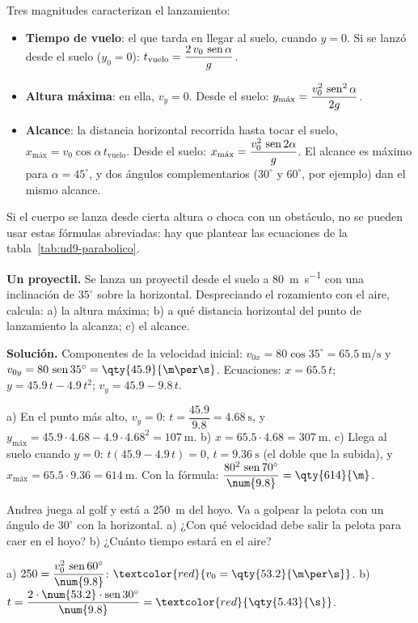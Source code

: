 Tres magnitudes caracterizan el lanzamiento:
\begin{itemize}
    \item \textbf{Tiempo de vuelo}: el que tarda en llegar al suelo, cuando \(y = 0\). Si se lanzó desde el suelo (\(y_0 = 0\)):
    \(t_{\text{vuelo}} = \dfrac{2\,v_0\,\operatorname{sen}\alpha}{g}\).
    \item \textbf{Altura máxima}: en ella, \(v_y = 0\). Desde el suelo: \(y_{\text{máx}} = \dfrac{v_0^2\,\operatorname{sen}^2\alpha}{2g}\).
    \item \textbf{Alcance}: la distancia horizontal recorrida hasta tocar el suelo, \(x_{\text{máx}} = v_0\cos\alpha\,t_{\text{vuelo}}\).
    Desde el suelo: \(x_{\text{máx}} = \dfrac{v_0^2\,\operatorname{sen} 2\alpha}{g}\). El alcance es máximo para \(\alpha = 45^\circ\), y dos
    ángulos complementarios (\(30^\circ\) y \(60^\circ\), por ejemplo) dan el mismo alcance.
\end{itemize}
Si el cuerpo se lanza desde cierta altura o choca con un obstáculo, no se pueden usar estas fórmulas abreviadas: hay que plantear las
ecuaciones de la tabla~\ref{tab:ud9-parabolico}.

\begin{example}
    \textbf{Un proyectil.} Se lanza un proyectil desde el suelo a \qty{80}{\m\per\s} con una inclinación de \(35^\circ\) sobre la
    horizontal. Despreciando el rozamiento con el aire, calcula: a) la altura máxima; b) a qué distancia horizontal del punto de
    lanzamiento la alcanza; c) el alcance.

    \textbf{Solución.} Componentes de la velocidad inicial: \(v_{0x} = 80\cos 35^\circ = \qty{65.5}{\m\per\s}\) y
    \(v_{0y} = 80\,\sen 35^\circ = \qty{45.9}{\m\per\s}\). Ecuaciones: \(x = \num{65.5}\,t\); \(y = \num{45.9}\,t - \num{4.9}\,t^2\);
    \(v_y = \num{45.9} - \num{9.8}\,t\).

    a) En el punto más alto, \(v_y = 0\): \(t = \dfrac{\num{45.9}}{\num{9.8}} = \qty{4.68}{\s}\), y
    \(y_{\text{máx}} = \num{45.9} \cdot \num{4.68} - \num{4.9} \cdot \num{4.68}^2 = \qty{107}{\m}\).
    b) \(x = \num{65.5} \cdot \num{4.68} = \qty{307}{\m}\).
    c) Llega al suelo cuando \(y = 0\): \(t(\num{45.9} - \num{4.9}\,t) = 0\), \(t = \qty{9.36}{\s}\) (el doble que la subida), y
    \(x_{\text{máx}} = \num{65.5} \cdot \num{9.36} = \qty{614}{\m}\). Con la fórmula: \(\dfrac{80^2\,\sen 70^\circ}{\num{9.8}} =
    \qty{614}{\m}\).
\end{example}

\begin{exercise}
    Andrea juega al golf y está a \qty{250}{\m} del hoyo. Va a golpear la pelota con un ángulo de \(30^\circ\) con la horizontal.
    a) ¿Con qué velocidad debe salir la pelota para caer en el hoyo? b) ¿Cuánto tiempo estará en el aire?
    \begin{solu}
        a) \(250 = \dfrac{v_0^2\,\sen 60^\circ}{\num{9.8}}\): \(\textcolor{red}{v_0 = \qty{53.2}{\m\per\s}}\).
        b) \(t = \dfrac{2 \cdot \num{53.2} \cdot \sen 30^\circ}{\num{9.8}} = \textcolor{red}{\qty{5.43}{\s}}\).
    \end{solu}
\end{exercise}


